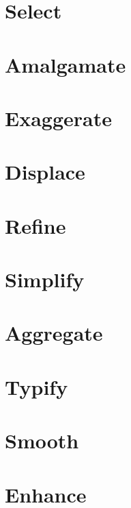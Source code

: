 \documentclass[
]{book}
\begin{document}
\hypertarget{select}{%
\section{Select}\label{select}}

\hypertarget{amalgamate}{%
\section{Amalgamate}\label{amalgamate}}

\hypertarget{exaggerate}{%
\section{Exaggerate}\label{exaggerate}}

\hypertarget{displace}{%
\section{Displace}\label{displace}}

\hypertarget{refine}{%
\section{Refine}\label{refine}}

\hypertarget{simplify}{%
\section{Simplify}\label{simplify}}

\hypertarget{aggregate}{%
\section{Aggregate}\label{aggregate}}

\hypertarget{typify}{%
\section{Typify}\label{typify}}

\hypertarget{smooth}{%
\section{Smooth}\label{smooth}}

\hypertarget{enhance}{%
\section{Enhance}\label{enhance}}
\end{document}
